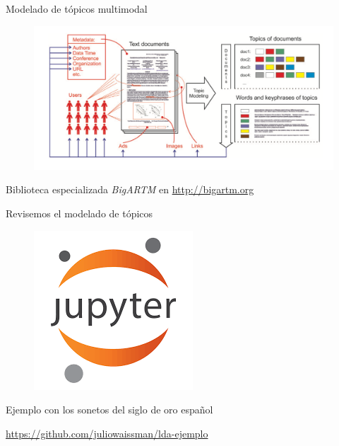 \documentclass[presentation, t]{beamer}
\begin{document}
\begin{frame}{Modelado de tópicos multimodal}
\begin{figure}[htbp]
\centering
\includegraphics[width=.85\textwidth]{./imagenes/mmtm.png}
\end{figure}
\begin{center}
Biblioteca especializada \emph{BigARTM} en \href{http://bigartm.org}{http://bigartm.org}
\end{center}
\end{frame}


\begin{frame}{Revisemos el modelado de tópicos}
\begin{figure}[htbp]
\centering
\includegraphics[width=.35\textwidth]{./imagenes/jupyter.png}
\end{figure}
\begin{center}
   Ejemplo con los sonetos del siglo de oro español

   \href{https://github.com/juliowaissman/lda-ejemplo}{https://github.com/juliowaissman/lda-ejemplo}
\end{center}
\end{frame}
\end{document}
